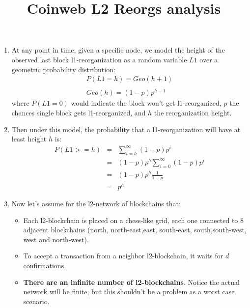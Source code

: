 \documentclass[120pt]{article}
\begin{document}
\title{Coinweb L2 Reorgs analysis}
\date{\vspace{-5ex}}
\maketitle
\medskip
\begin{enumerate}
\item At any point in time, given a specific node, we model the height of the observed last block l1-reorganization as a random variable $L1$ over a geometric probability distribution:
$$
\begin{array}{lcl}
P( L1 = h ) = Geo( h + 1) \\
\\
Geo(h) = ( 1 - p)p^{h-1}
\end{array}
$$
where $P( L1 = 0)$ would indicate the block won't get l1-reorganized, $p$ the chances single block gets l1-reorganized, and $h$ the reorganization height.
\item Then under this model, the probability that a l1-reorganization will have at least height $h$ is:
$$
\begin{array}{lcl}
P( L1 >= h ) & = & \sum\limits_{ i = h}^{\infty} ( 1 - p)p^{i} \\
             & = & ( 1 - p)p^{h}\sum\limits_{ i = 0}^{\infty} ( 1 - p)p^{i} \\
             & = & ( 1 - p)p^{h}\frac{1}{1 -p} \\
             & = & p^h
\end{array}
$$
\item Now let's assume for the l2-network of blockchains that:
\begin{itemize}
  \item Each l2-blockchain is placed on a chess-like grid, each one connected to 8 adjacent blockchains (north, north-east,east, south-east, south,south-west, west and north-west).
  
  \item To accept a transaction from a neighbor l2-blockchain, it waits for $d$ confirmations.
  
  \item \textbf{There are an infinite number of l2-blockchains}. Notice the actual network will be finite, but this shouldn't be a problem as a worst case scenario.
  

\end{itemize}
\end{enumerate}
\end{document}
